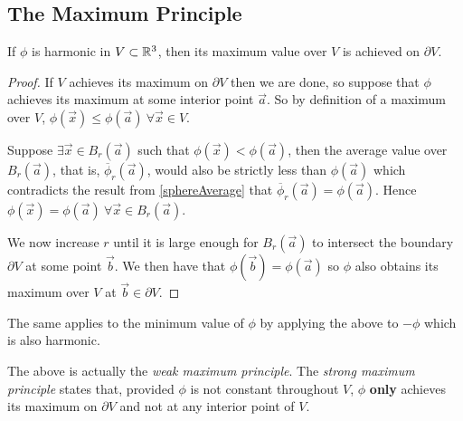 \documentclass[../main.tex]{subfiles}
\begin{document}
\subsection{The Maximum Principle}
\begin{proposition}
  If $\phi$ is harmonic in $V \subset \mathbb{R}^3$, then its maximum value over $V$ is achieved on $\partial V$.
\end{proposition}
\begin{proof}
  If $V$ achieves its maximum on $\partial V$ then we are done, so suppose that $\phi$ achieves its maximum at some interior point $\vec{a}$.
  So by definition of a maximum over $V$, $\phi(\vec{x}) \leq \phi(\vec{a})\ \forall \vec{x} \in V$.

  Suppose $\exists \vec{x} \in B_r(\vec{a})$ such that $\phi(\vec{x}) < \phi(\vec{a})$, then the average value over $B_r(\vec{a})$, that is, $\overline{\phi}_r(\vec{a})$, would also be strictly less than $\phi(\vec{a})$ which contradicts the result from \cref{sphereAverage} that $\overline{\phi}_r(\vec{a}) = \phi(\vec{a})$.
  Hence $\phi(\vec{x}) = \phi(\vec{a})\ \forall \vec{x} \in B_r(\vec{a})$.

  We now increase $r$ until it is large enough for $B_r(\vec{a})$ to intersect the boundary $\partial V$ at some point $\vec{b}$.
  We then have that $\phi(\vec{b}) = \phi(\vec{a})$ so $\phi$ also obtains its maximum over $V$ at $\vec{b} \in \partial V$.
\end{proof}
\begin{remark}
  The same applies to the minimum value of $\phi$ by applying the above to $-\phi$ which is also harmonic.
\end{remark}
\begin{remark}
  \nonexaminable
  The above is actually the \textit{weak maximum principle}.
  The \textit{strong maximum principle} states that, provided $\phi$ is not constant throughout $V$, $\phi$ \textbf{only} achieves its maximum on $\partial V$ and not at any interior point of $V$.
\end{remark}
\end{document}
